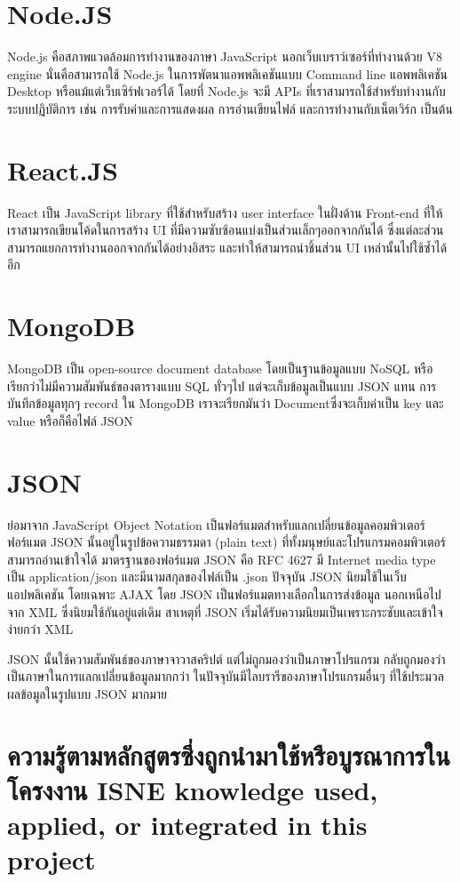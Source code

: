 \section{Node.JS}
Node.js คือสภาพแวดล้อมการทำงานของภาษา JavaScript นอกเว็บเบราว์เซอร์ที่ทำงานด้วย V8 engine นั่นคือสามารถใช้ Node.js ในการพัตนาแอพพลิเคชันแบบ Command line แอพพลิเคชัน Desktop หรือแม้แต่เว็บเซิร์ฟเวอร์ได้ 
โดยที่ Node.js จะมี APIs ที่เราสามารถใช้สำหรับทำงานกับระบบปฏิบัติการ เช่น การรับค่าและการแสดงผล การอ่านเขียนไฟล์ และการทำงานกับเน็ตเวิร์ก เป็นต้น

\section{React.JS}
React เป็น JavaScript library ที่ใช้สำหรับสร้าง user interface ในฝั่งด้าน Front-end ที่ให้เราสามารถเขียนโค้ดในการสร้าง UI ที่มีความซับซ้อนแบ่งเป็นส่วนเล็กๆออกจากกันได้ ซึ่งแต่ละส่วนสามารถแยกการทำงานออกจากกันได้อย่างอิสระ 
และทำให้สามารถนำชิ้นส่วน UI เหล่านั้นไปใช้ซ้ำได้อีก

\section{MongoDB}
MongoDB เป็น open-source document database โดยเป็นฐานข้อมูลแบบ NoSQL หรือเรียกว่าไม่มีความสัมพันธ์ของตารางแบบ SQL ทั่วๆไป แต่จะเก็บข้อมูลเป็นแบบ JSON แทน การบันทึกข้อมูลทุกๆ record ใน MongoDB 
เราจะเรียกมันว่า Documentซึ่งจะเก็บค่าเป็น key และ value หรือก็คือไฟล์ JSON

\section{JSON}
ย่อมาจาก JavaScript Object Notation เป็นฟอร์แมตสำหรับแลกเปลี่ยนข้อมูลคอมพิวเตอร์ \\ ฟอร์แมต JSON นั้นอยู่ในรูปข้อความธรรมดา (plain text) ที่ทั้งมนุษย์และโปรแกรมคอมพิวเตอร์สามารถอ่านเข้าใจได้ 
มาตรฐานของฟอร์แมต JSON คือ RFC 4627 มี Internet media type เป็น application/json และมีนามสกุลของไฟล์เป็น .json
ปัจจุบัน JSON นิยมใช้ในเว็บแอปพลิเคชัน โดยเฉพาะ AJAX โดย JSON เป็นฟอร์แมตทางเลือกในการส่งข้อมูล นอกเหนือไปจาก XML ซึ่งนิยมใช้กันอยู่แต่เดิม สาเหตุที่ JSON เริ่มได้รับความนิยมเป็นเพราะกระชับและเข้าใจง่ายกว่า XML

JSON นั้นใช้ความสัมพันธ์ของภาษาจาวาสคริปต์ แต่ไม่ถูกมองว่าเป็นภาษาโปรแกรม กลับถูกมองว่าเป็นภาษาในการแลกเปลี่ยนข้อมูลมากกว่า ในปัจจุบันมีไลบรารีของภาษาโปรแกรมอื่นๆ ที่ใช้ประมวลผลข้อมูลในรูปแบบ JSON มากมาย

\section{\ifcpe%
ความรู้ตามหลักสูตรซึ่งถูกนำมาใช้หรือบูรณาการในโครงงาน
\else%
ISNE knowledge used, applied, or integrated in this project
\fi
}
